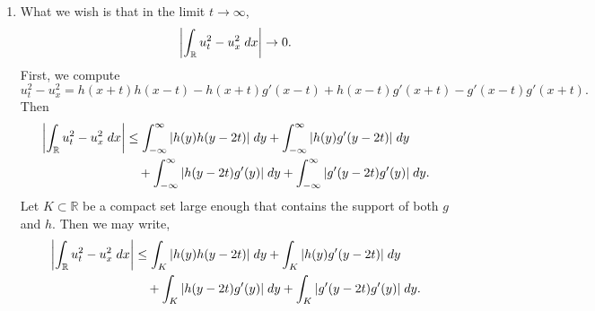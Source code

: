 \documentclass{article}
\begin{document}
\begin{enumerate}[itemsep =-2pt,label = (\alph{*})]
\begin{enumerate}[itemsep =-2pt,label = (\roman{*})]
	\begin{align*}
		\begin{split}
			\dot{e}(t) &= \frac{1}{2}\frac{\partial}{\partial t}\int_{-\infty}^{\infty}u_t^2 + u_x^2\;dx = \frac{1}{2}\frac{\partial}{\partial t}\int_{K_T}u_t^2 + u_x^2\;dx \\
			&= \frac{1}{2}\int_{K_T}\partial_t(u_t^2 + u_x^2)\;dx \\
			&= \int_{K_T}u_tu_{tt} + u_x \cdot \partial_x u_t\;dx \\
			&= \int_{K_T}u_t(u_{tt} - u_{xx})\;dx \qquad (\text{by integration by parts}) \\
			&= 0, 
		\end{split}
	\end{align*}	
	where there is no boundary term since $u_x, u_t$ are supported inside $K_T$. So we have shown that $\dot{e}(t) = 0$ for all $0 \leq t \leq T$. Since $T > 0$ was chosen arbitrarily, it follows that $\dot{e}(t)\equiv 0$. Therefore, the total energy is constant in $t$. 
	\item What we wish is that in the limit $t \to \infty$, 
	\begin{equation*}
		\left| \int_{\mathbb{R}}u_t^2 - u_x^2\;dx \right| \to 0. 
	\end{equation*}
	First, we compute 
	\begin{equation*}
		u_t^2 - u_x^2 = h(x + t)h(x - t) - h(x + t)g'(x - t) + h(x - t)g'(x + t) - g'(x - t)g'(x + t). 
	\end{equation*}
	Then 
	\begin{align*}
		\begin{split}
			\left| \int_{\mathbb{R}}u_t^2 - u_x^2\;dx \right| &\leq \int_{-\infty}^{\infty}|h(y)h(y - 2t)|\;dy + \int_{-\infty}^{\infty}|h(y)g'(y - 2t)|\;dy \\
			&\quad+ \int_{-\infty}^{\infty}|h(y - 2t)g'(y)|\;dy + \int_{-\infty}^{\infty}|g'(y - 2t)g'(y)|\;dy.
		\end{split}
	\end{align*}
	Let $K \subset \mathbb{R}$ be a compact set large enough that contains the support of both $g$ and $h$. Then we may write, 
	\begin{align*}
		\begin{split}
			\left| \int_{\mathbb{R}}u_t^2 - u_x^2\;dx \right| &\leq \int_{K}|h(y)h(y - 2t)|\;dy + \int_{K}|h(y)g'(y - 2t)|\;dy \\
			&\quad+ \int_{K}|h(y - 2t)g'(y)|\;dy + \int_{K}|g'(y - 2t)g'(y)|\;dy.
		\end{split}
	\end{align*}

\end{enumerate}
\end{enumerate}
\end{document}
